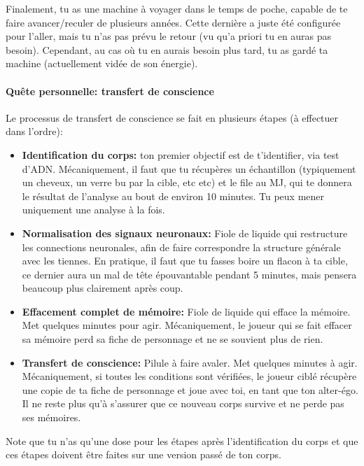 {	\par Finalement, tu as une machine à voyager dans le temps de poche, capable de te faire avancer/reculer de plusieurs années. Cette dernière a juste été configurée pour l'aller, mais tu n'as pas prévu le retour (vu qu'a priori tu en auras pas besoin). Cependant, au cas où tu en aurais besoin plus tard, tu as gardé ta machine (actuellement vidée de son énergie).
	
	\paragraph{Quête personnelle: transfert de conscience} Le processus de transfert de conscience se fait en plusieurs étapes (à effectuer dans l'ordre):
	\begin{itemize}
		\item \textbf{Identification du corps:} ton premier objectif est de t'identifier, via test d'ADN. Mécaniquement, il faut que tu récupères un échantillon (typiquement un cheveux, un verre bu par la cible, etc etc) et le file au MJ, qui te donnera le résultat de l'analyse au bout de environ 10 minutes. Tu peux mener uniquement une analyse à la fois.
		
		\item \textbf{Normalisation des signaux neuronaux:} Fiole de liquide qui restructure les connections neuronales, afin de faire correspondre la structure générale avec les tiennes. En pratique, il faut que tu fasses boire un flacon à ta cible, ce dernier aura un mal de tête épouvantable pendant 5 minutes, mais pensera beaucoup plus clairement après coup.
		
		\item \textbf{Effacement complet de mémoire:} Fiole de liquide qui efface la mémoire. Met quelques minutes pour agir. Mécaniquement, le joueur qui se fait effacer sa mémoire perd sa fiche de personnage et ne se souvient plus de rien.
		
		\item \textbf{Transfert de conscience:} Pilule à faire avaler. Met quelques minutes à agir. Mécaniquement, si toutes les conditions sont vérifiées, le joueur ciblé récupère une copie de ta fiche de personnage et joue avec toi, en tant que ton alter-égo. Il ne reste plus qu'à s'assurer que ce nouveau corps survive et ne perde pas ses mémoires.
	\end{itemize}
	
	Note que tu n'as qu'une dose pour les étapes après l'identification du corps et que ces étapes doivent être faites sur une version passé de ton corps.
}



